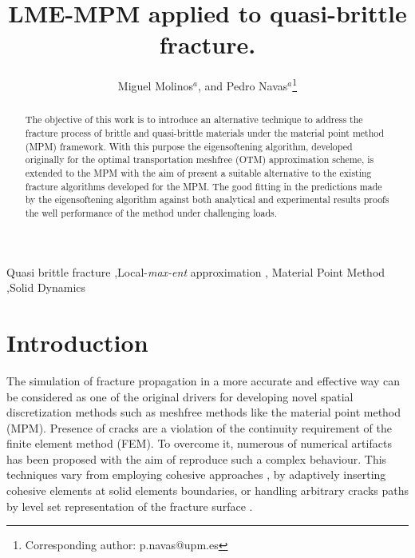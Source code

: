 \message{ !name(2020_EFM_MPM_Eigensoftening.tex)}\documentclass[preprint,12pt,a4paper]{elsarticle}
\begin{document}


\begin{frontmatter}

\title{LME-MPM applied to quasi-brittle fracture.}

\author{
Miguel Molinos$^a$,
and Pedro Navas$^a$\footnote{Corresponding author: p.navas@upm.es}
 }
 \address{
 $^a$ ETSI Caminos, Canales y Puertos, Universidad Polit\'ectnica de Madrid.\\
 c. Prof. Aranguren 3, 28040 Madrid, Spain
}

\begin{abstract}
  The objective of this work is to introduce an alternative
  technique to address the fracture process of brittle and
  quasi-brittle materials under the material point method (MPM)
  framework. With this purpose the eigensoftening algorithm, developed
  originally for the optimal transportation meshfree (OTM)
  approximation scheme, is extended to the MPM with the aim of present
  a suitable alternative to the existing fracture algorithms developed
  for the MPM. The good fitting in the predictions made by the
  eigensoftening algorithm against both analytical and experimental
  results proofs the well performance of the method under challenging loads.
\end{abstract}

\begin{keyword}
Quasi brittle fracture \sep Local-\textit{max-ent} approximation \sep
Material Point Method \sep Solid Dynamics
\end{keyword}

\end{frontmatter}

\linenumbers

\section{Introduction}
\label{sec:1}

The simulation of fracture propagation in a more accurate and
effective way can be considered as one of the original drivers for
developing novel spatial discretization methods such as meshfree
methods like the material point method (MPM). Presence of cracks are a
violation of the continuity requirement of the finite element method
(FEM). To overcome it, numerous of numerical artifacts has been
proposed with the aim of reproduce such a complex behaviour. This
techniques vary from employing cohesive approaches
\cite{Barenblatt,Hilleborg_1976}, by adaptively inserting cohesive
elements \cite{Ortiz_1999,Pandolfi_2002,Ruiz_2000} at solid elements
boundaries, or handling arbitrary cracks paths by level set
representation of the fracture surface \cite{Belytschko_03}.
\end{document}
